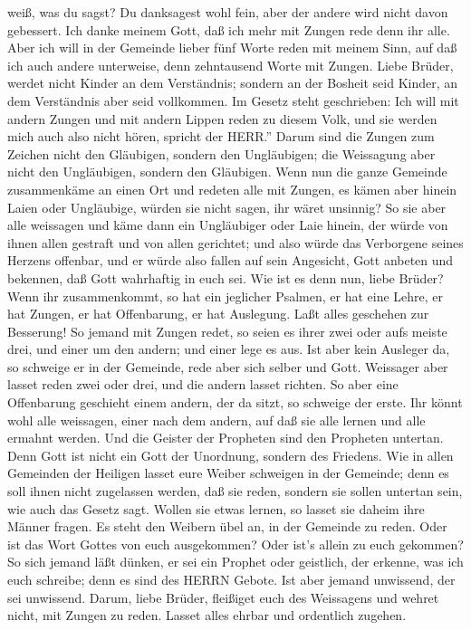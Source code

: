 weiß, was du sagst?  Du danksagest wohl fein, aber der
andere wird nicht davon gebessert.  Ich danke meinem Gott,
daß ich mehr mit Zungen rede denn ihr alle.  Aber ich will
in der Gemeinde lieber fünf Worte reden mit meinem Sinn, auf daß ich
auch andere unterweise, denn zehntausend Worte mit Zungen. 
Liebe Brüder, werdet nicht Kinder an dem Verständnis; sondern an der
Bosheit seid Kinder, an dem Verständnis aber seid vollkommen.
 Im Gesetz steht geschrieben: Ich will mit andern Zungen
und mit andern Lippen reden zu diesem Volk, und sie werden mich auch
also nicht hören, spricht der HERR.''  Darum sind die
Zungen zum Zeichen nicht den Gläubigen, sondern den Ungläubigen; die
Weissagung aber nicht den Ungläubigen, sondern den Gläubigen.
 Wenn nun die ganze Gemeinde zusammenkäme an einen Ort und
redeten alle mit Zungen, es kämen aber hinein Laien oder Ungläubige,
würden sie nicht sagen, ihr wäret unsinnig?  So sie aber
alle weissagen und käme dann ein Ungläubiger oder Laie hinein, der würde
von ihnen allen gestraft und von allen gerichtet;  und also
würde das Verborgene seines Herzens offenbar, und er würde also fallen
auf sein Angesicht, Gott anbeten und bekennen, daß Gott wahrhaftig in
euch sei.  Wie ist es denn nun, liebe Brüder? Wenn ihr
zusammenkommt, so hat ein jeglicher Psalmen, er hat eine Lehre, er hat
Zungen, er hat Offenbarung, er hat Auslegung. Laßt alles geschehen zur
Besserung!  So jemand mit Zungen redet, so seien es ihrer
zwei oder aufs meiste drei, und einer um den andern; und einer lege es
aus.  Ist aber kein Ausleger da, so schweige er in der
Gemeinde, rede aber sich selber und Gott.  Weissager aber
lasset reden zwei oder drei, und die andern lasset richten.
 So aber eine Offenbarung geschieht einem andern, der da
sitzt, so schweige der erste.  Ihr könnt wohl alle
weissagen, einer nach dem andern, auf daß sie alle lernen und alle
ermahnt werden.  Und die Geister der Propheten sind den
Propheten untertan.  Denn Gott ist nicht ein Gott der
Unordnung, sondern des Friedens.  Wie in allen Gemeinden
der Heiligen lasset eure Weiber schweigen in der Gemeinde; denn es soll
ihnen nicht zugelassen werden, daß sie reden, sondern sie sollen
untertan sein, wie auch das Gesetz sagt.  Wollen sie etwas
lernen, so lasset sie daheim ihre Männer fragen. Es steht den Weibern
übel an, in der Gemeinde zu reden.  Oder ist das Wort
Gottes von euch ausgekommen? Oder ist's allein zu euch gekommen?
 So sich jemand läßt dünken, er sei ein Prophet oder
geistlich, der erkenne, was ich euch schreibe; denn es sind des HERRN
Gebote.  Ist aber jemand unwissend, der sei unwissend.
 Darum, liebe Brüder, fleißiget euch des Weissagens und
wehret nicht, mit Zungen zu reden.  Lasset alles ehrbar und
ordentlich zugehen.

